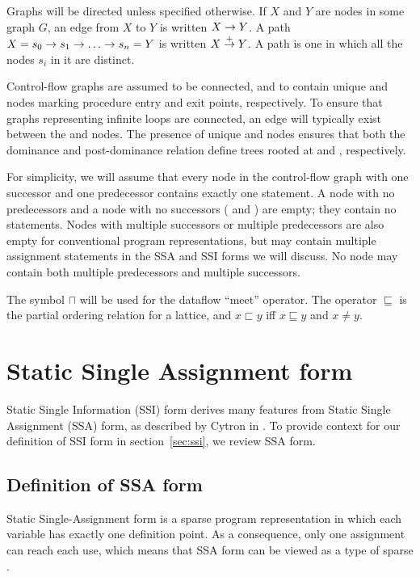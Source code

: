 \documentclass[12pt,titlepage,twoside]{article}
\newcommand{\meet}{\ensuremath{\sqcap}}
\newcommand{\latlt}{\ensuremath{\sqsubset}}
\newcommand{\latleq}{\ensuremath{\sqsubseteq}}
\let\oldsection\section
\renewcommand{\section}{\setcounter{figure}{0}\setcounter{table}{0}\oldsection}
\begin{document}
Graphs will be directed unless specified otherwise.  If $X$ and $Y$
are nodes in some graph $G$, an edge from $X$ to $Y$ is written
$X \rightarrow Y$. A path \mbox{$X=s_0\rightarrow s_1\rightarrow \ldots \rightarrow s_n=Y$} is
written $X \stackrel{+}{\rightarrow} Y$.  A  path is one in which all
the nodes $s_i$ in it are distinct.

Control-flow graphs are assumed to be connected, and to contain unique
 and  nodes marking procedure entry and exit
points, respectively.  To ensure that graphs representing
infinite loops are connected, an edge will typically exist between
the  and  nodes.  
The presence of unique  and  nodes
ensures that both the dominance and post-dominance relation define
trees rooted at  and , respectively.

For simplicity, we will assume that every node in the control-flow
graph with one successor and one predecessor contains exactly one
statement.  A node with no predecessors and a node with no successors
( and ) are empty; they contain no statements.
Nodes with multiple successors or multiple predecessors are also empty
for conventional program representations, but may contain multiple
\phisigfunction[or]{} assignment statements in the SSA and SSI forms
we will discuss.  No node may contain both multiple predecessors and
multiple successors.

The symbol $\meet$ will be used for the dataflow ``meet'' operator.
The operator $\latleq$ is the %
partial ordering relation for a lattice, and $x \latlt y$ iff $x
\latleq y$ and $x \not= y$.

\section{Static Single Assignment form}\label{sec:ssa}
Static Single Information (SSI) form derives many features from Static
Single Assignment (SSA) form, as described by Cytron in
\cite{cytron89:ssa}.  To provide context for
our definition of SSI form in section~\ref{sec:ssi}, we review SSA form.

\subsection{Definition of SSA form}

Static Single-Assignment form is a sparse program representation in
which each variable has exactly one definition point.  As a
consequence, only one assignment can reach each use, which means that
SSA form can be viewed as a type of sparse 
\cite{aho88:dragon}.
\end{document}
